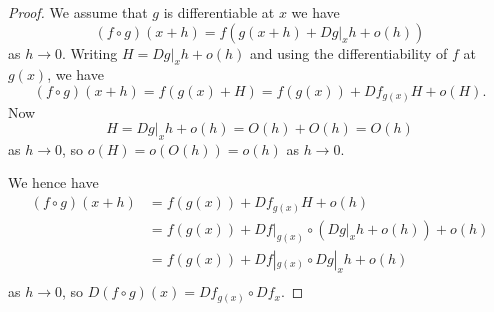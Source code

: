 \documentclass[10pt]{article}
\begin{document}
  \begin{proof}
    We assume that $g$ is differentiable at $x$ we have
    \[
      (f \circ g)(x+h) = f(g(x+h) + Dg|_{x}h + o(h))  
    \]
    as $h \to 0$. Writing $H = Dg|_{x}h + o(h)$ and using the differentiability of $f$ at $g(x)$, we have
    \[
      (f \circ g)(x+h) = f(g(x)+H) = f(g(x)) + Df_{g(x)}H + o(H).  
    \]
    Now
    \[
      H = Dg|_{x}h + o(h) = O(h) + O(h) = O(h)  
    \]
    as $h \to 0$, so $o(H) = o(O(h)) = o(h)$ as $h \to 0$.

    We hence have
    \[
      \begin{aligned}
        (f \circ g)(x+h) &= f(g(x)) + Df_{g(x)}H + o(h) \\
        &= f(g(x)) + Df|_{g(x)} \circ (Dg|_{x}h+o(h)) + o(h) \\
        &= f(g(x)) + Df|_{g(x)} \circ Dg|_{x}h + o(h) \\
      \end{aligned}
    \]
    as $h \to 0$, so $D(f \circ g)(x) = Df_{g(x)} \circ Df_{x}$.
  \end{proof}
\end{document}
